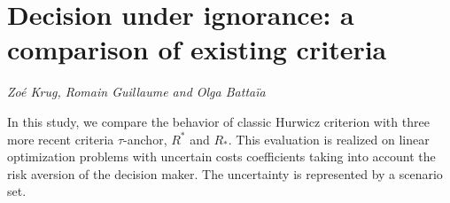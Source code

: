 \documentclass[../booklet.tex]{subfiles}
\begin{document}
\section[Decision under ignorance: a comparison of existing criteria. {\it Zoé Krug, Romain Guillaume and Olga Battaïa}]{Decision under ignorance: a comparison of existing criteria}
  

\begin{center}
  {\it Zoé Krug, Romain Guillaume and Olga Battaïa}
\end{center}

\vskip 0.8cm


In this study, we compare the behavior of classic Hurwicz criterion with three more recent criteria $\tau$-anchor, $R^*$ and $R_*$. 
This evaluation is realized on linear optimization problems with uncertain costs coefficients taking into account the risk aversion of the decision maker. The uncertainty is represented by a scenario set. 
\end{document}
